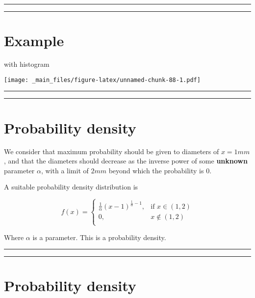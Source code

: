 \documentclass[
]{book}
\begin{document}
\begin{center}\rule{0.5\linewidth}{0.5pt}\end{center}

\begin{center}\rule{0.5\linewidth}{0.5pt}\end{center}

\hypertarget{example-15}{%
\section{Example}\label{example-15}}

with histogram

\texttt{[image: \_main\_files/figure-latex/unnamed-chunk-88-1.pdf]}

\begin{center}\rule{0.5\linewidth}{0.5pt}\end{center}

\begin{center}\rule{0.5\linewidth}{0.5pt}\end{center}

\hypertarget{probability-density}{%
\section{Probability density}\label{probability-density}}

We consider that maximum probability should be given to diameters of \(x=1mm\), and that the diameters should decrease as the inverse power of some \textbf{unknown} parameter \(\alpha\), with a limit of \(2mm\) beyond which the probability is \(0\).

A suitable probability density distribution is

\[
    f(x)= 
\begin{cases}
\frac{1}{\alpha}(x-1)^{\frac{1}{\alpha}-1},& \text{if } x \in (1,2)\\
    0,& x \notin (1,2)\\
\end{cases}
\]

Where \(\alpha\) is a parameter. This is a probability density.

\begin{center}\rule{0.5\linewidth}{0.5pt}\end{center}

\begin{center}\rule{0.5\linewidth}{0.5pt}\end{center}

\hypertarget{probability-density-1}{%
\section{Probability density}\label{probability-density-1}}
\end{document}
